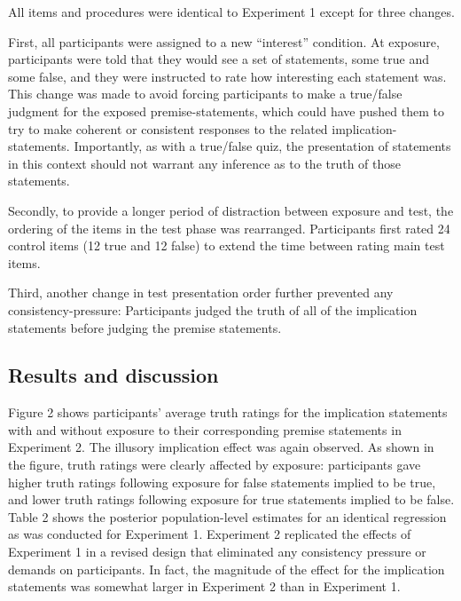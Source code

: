 \documentclass[10pt, letterpaper]{article}
\begin{document}
All items and procedures were identical to Experiment 1 except for three
changes.

First, all participants were assigned to a new ``interest'' condition.
At exposure, participants were told that they would see a set of
statements, some true and some false, and they were instructed to rate
how interesting each statement was. This change was made to avoid
forcing participants to make a true/false judgment for the exposed
premise-statements, which could have pushed them to try to make coherent
or consistent responses to the related implication-statements.
Importantly, as with a true/false quiz, the presentation of statements
in this context should not warrant any inference as to the truth of
those statements.

Secondly, to provide a longer period of distraction between exposure and
test, the ordering of the items in the test phase was rearranged.
Participants first rated 24 control items (12 true and 12 false) to
extend the time between rating main test items.

Third, another change in test presentation order further prevented any
consistency-pressure: Participants judged the truth of all of the
implication statements before judging the premise statements.

\hypertarget{results-and-discussion-1}{%
\subsection{Results and discussion}\label{results-and-discussion-1}}

Figure 2 shows participants' average truth ratings for the implication
statements with and without exposure to their corresponding premise
statements in Experiment 2. The illusory implication effect was again
observed. As shown in the figure, truth ratings were clearly affected by
exposure: participants gave higher truth ratings following exposure for
false statements implied to be true, and lower truth ratings following
exposure for true statements implied to be false. Table 2 shows the
posterior population-level estimates for an identical regression as was
conducted for Experiment 1. Experiment 2 replicated the effects of
Experiment 1 in a revised design that eliminated any consistency
pressure or demands on participants. In fact, the magnitude of the
effect for the implication statements was somewhat larger in Experiment
2 than in Experiment 1.
\end{document}
